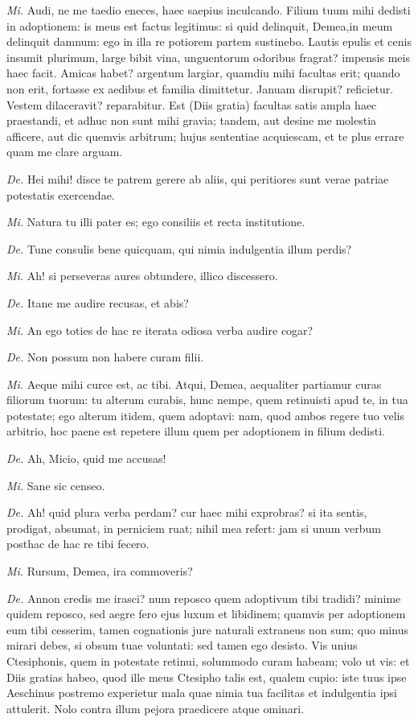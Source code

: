 {\textit{Mi.} Audi, ne me taedio eneces, haec saepius inculcando. Filium tuum mihi dedisti in adoptionem: is meus est factus legitimus: si quid delinquit, Demea,in meum delinquit damnum: ego in illa re potiorem partem sustinebo. Lautis epulis et cenis insumit plurimum, large bibit vina, unguentorum odoribus fragrat?  impensis meis haec facit. Amicas habet? argentum largiar, quamdiu mihi facultas erit; quando non erit, fortasse ex aedibus et familia dimittetur. Januam disrupit? reficietur. Vestem dilaceravit? reparabitur. Est (Diis gratia) facultas satis ampla haec praestandi, et adhuc non sunt mihi gravia; tandem, aut desine me molestia afficere, aut dic quemvis arbitrum; hujus sententiae acquiescam, et te plus errare quam me clare arguam.

\textit{De.} Hei mihi! disce te patrem gerere ab aliis, qui peritiores sunt verae patriae potestatis exercendae. 

\textit{Mi.} Natura tu illi pater es; ego consiliis et recta institutione. 

\textit{De.} Tune consulis bene quicquam, qui nimia indulgentia illum perdis? 

\textit{Mi.} Ah! si perseveras aures obtundere, illico discessero. 

\textit{De.} Itane me audire recusas, et abis? 

\textit{Mi.} An ego toties de hac re iterata odiosa verba audire cogar? 

\textit{De.} Non possum non habere curam filii. 

\textit{Mi.} Aeque mihi curce est, ac tibi. Atqui, Demea, aequaliter partiamur curas filiorum tuorum: tu alterum curabis, hunc nempe, quem retinuisti apud te, in tua potestate; ego alterum itidem, quem adoptavi: nam, quod ambos regere tuo velis arbitrio, hoc paene est repetere illum quem per adoptionem in filium dedisti. 

\textit{De.} Ah, Micio, quid me accusas! 

\textit{Mi.} Sane sic censeo. 

\textit{De.} Ah! quid plura verba perdam? cur haec mihi exprobras? si ita sentis, prodigat, absumat, in perniciem ruat; nihil mea refert: jam si unum verbum posthac de hac re tibi fecero. 

\textit{Mi.} Rursum, Demea, ira commoveris? 

\textit{De.} Annon credis me irasci? num reposco quem adoptivum tibi tradidi? minime quidem reposco, sed aegre fero ejus luxum et libidinem; quamvis per adoptionem eum tibi cesserim, tamen cognationis jure naturali extraneus non sum; quo minus mirari debes, si obsum tuae voluntati: sed tamen ego desisto. Vis unius Ctesiphonis, quem in potestate retinui, solummodo curam habeam; volo ut vis: et Diis gratias habeo, quod ille meus Ctesipho talis est, qualem cupio: iste tuus ipse Aeschinus postremo experietur mala quae nimia tua facilitas et indulgentia ipsi attulerit. Nolo contra illum pejora praedicere atque ominari. 

}

